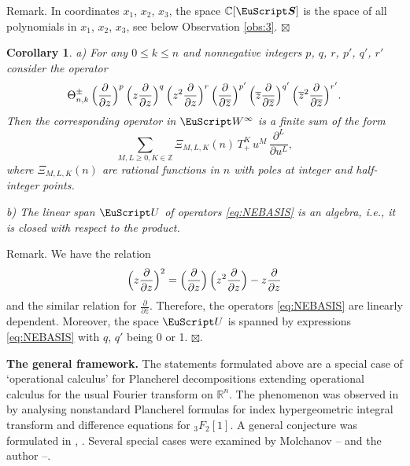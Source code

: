 \documentclass[]{amsart}
\newcounter{sec}
\newcounter{punct}[sec]
\def\punct{\refstepcounter{punct}{\arabic{sec}.\arabic{punct}.  }}
\newtheorem{corollary}[theorem]{Corollary}
\def\le{\leqslant}
\def\ge{\geqslant}
\def\cS{\boldsymbol{\EuScript S}}
\def\cU{\EuScript U}
\def\cW{\EuScript W}
\def\R {{\mathbb R }}
\def\C {{\mathbb C }}
\def\Z{{\mathbb Z}}
\def\ov{\overline}
\def\sm{\smallskip}
\begin{document}
{\sc Remark.} In coordinates $x_1$, $x_2$, $x_3$, the space $\C[\cS]$
is the space of all polynomials in $x_1$, $x_2$, $x_3$,
see below Observation \ref{obs:3}.
\hfill $\boxtimes$

\begin{corollary}
\label{cor:}
{\rm a)} For any  $0\le k\le n$ and nonnegative integers
$p$, $q$, $r$, $p'$, $q'$, $r'$ 
consider the operator
\begin{equation}
\Theta_{n,k}^\pm \, \Bigl(\frac{\partial}{\partial z}\Bigr)^p\,
\Bigl(z\frac{\partial}{\partial z}\Bigr)^q \,
\Bigl(z^2\frac{\partial}{\partial z}\Bigr)^r\,
\Bigl(\frac{\partial}{\partial \ov z}\Bigr)^{p'}\,
\Bigl(\ov z\frac{\partial}{\partial \ov z}\Bigr)^{q'} \,
\Bigl(\ov z^2\frac{\partial}{\partial \ov z}\Bigr)^{r'}.
\label{eq:NEBASIS}
\end{equation}
Then the corresponding operator in $\cW^\infty$
is a finite sum
of the form
\begin{equation}
\sum_{M,L\ge 0, K\in \Z} \Xi_{M,L,K}(n) \, T_+^K\, u^M\, \frac{\partial^L}{\partial u^L},
\label{eq:diff-diff}
\end{equation}
where $\Xi_{M,L,K}(n)$ are rational functions in $n$ with poles at
integer and half-integer points.

\sm

{\rm b)} The linear span $\cU$ of operators \eqref{eq:NEBASIS}
is an algebra, i.e., it
is closed with respect to the product.
\end{corollary}

{\sc Remark.}
We have the relation
$$ \Bigl(z\frac{\partial}{\partial z}\Bigr)^2
=
 \Bigl(\frac{\partial}{\partial z}\Bigr) \,
 \Bigl(z^2\frac{\partial}{\partial z}\Bigr)
 -
 z\frac{\partial}{\partial z}
 $$
 and the similar relation for $\frac{\partial}{\partial \ov z}$.
 Therefore, the operators \eqref{eq:NEBASIS} are linearly dependent.
 Moreover, the space $\cU$ is spanned by expressions 
 \eqref{eq:NEBASIS} with $q$, $q'$ being 0 or 1.
 \hfill $\boxtimes$.


\sm


{\bf \punct The general framework.} The statements formulated above are a special case of `operational calculus' for Plancherel decompositions extending operational calculus for the usual Fourier transform on $\R^n$. The phenomenon was observed
in \cite{Ner1} by analysing nonstandard Plancherel formulas for index hypergeometric integral transform \cite{Ner0} and difference equations for
$_3F_2[1]$. A general conjecture was formulated in \cite{Ner1}, \cite{Ner-GL2}.
Several special cases were examined by Molchanov \cite{Mol1}--\cite{Mol3} and the author \cite{Ner1}--\cite{Ner-Lob}. 
\end{document}
